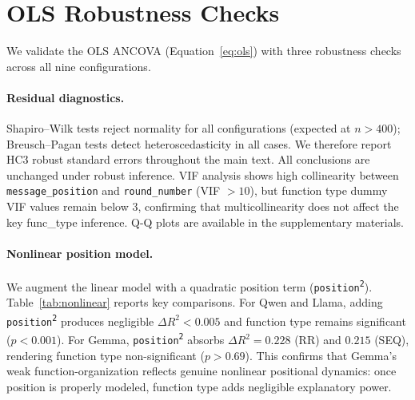 \section{OLS Robustness Checks}
\label{app:ols-robustness}

We validate the OLS ANCOVA (Equation~\ref{eq:ols}) with three robustness checks across all nine configurations.

\paragraph{Residual diagnostics.} Shapiro--Wilk tests reject normality for all configurations (expected at $n > 400$); Breusch--Pagan tests detect heteroscedasticity in all cases. We therefore report HC3 robust standard errors throughout the main text. All conclusions are unchanged under robust inference. VIF analysis shows high collinearity between \texttt{message\_position} and \texttt{round\_number} (VIF $> 10$), but function type dummy VIF values remain below 3, confirming that multicollinearity does not affect the key func\_type inference. Q-Q plots are available in the supplementary materials.

\paragraph{Nonlinear position model.} We augment the linear model with a quadratic position term (\texttt{position\textsuperscript{2}}). Table~\ref{tab:nonlinear} reports key comparisons. For Qwen and Llama, adding \texttt{position\textsuperscript{2}} produces negligible $\Delta R^2 < 0.005$ and function type remains significant ($p < 0.001$). For Gemma, \texttt{position\textsuperscript{2}} absorbs $\Delta R^2 = 0.228$ (RR) and $0.215$ (SEQ), rendering function type non-significant ($p > 0.69$). This confirms that Gemma's weak function-organization reflects genuine nonlinear positional dynamics: once position is properly modeled, function type adds negligible explanatory power.

